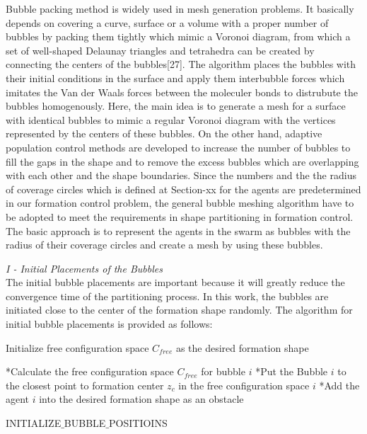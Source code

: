 \documentclass[twoside]{article}
\begin{document}
			Bubble packing method is widely used in mesh generation problems. It basically depends on covering a curve, surface or a volume with a proper number of bubbles by packing them tightly which mimic a Voronoi diagram, from which a set of well-shaped Delaunay triangles and tetrahedra can be created by connecting the centers of the bubbles[27].  The algorithm places the bubbles with their initial conditions in the surface and apply them interbubble forces which imitates the Van der Waals forces between the moleculer bonds  to distrubute the bubbles homogenously. Here, the main idea is to generate a mesh for a surface with identical bubbles to mimic a regular Voronoi diagram with the vertices represented by the centers of these bubbles. On the other hand, adaptive population control  methods are developed to increase the number of bubbles to fill the gaps in the shape and to remove the excess bubbles which are overlapping with each other and the shape boundaries. 
			 Since the numbers and the the radius of coverage circles which is defined at Section-xx for the agents are predetermined in our formation control problem, the general bubble meshing algorithm have to be adopted to meet the requirements in shape partitioning in formation control.  The basic approach is to represent the agents in the swarm as bubbles with the radius of  their coverage circles and create a mesh by using these bubbles. \newline
			
			\textit{			I - Initial Placements of the Bubbles} \\ 

		  The initial bubble placements are important because it will greatly reduce the convergence time of the partitioning process. In this work, the bubbles are initiated close to the center of the formation shape randomly. The algorithm for initial bubble placements is provided as follows:
		  

			
			
			\begin{algorithm}[H]
				
				Initialize free configuration space $C_{free}$ as the desired formation shape
				
				{		
					*Calculate the free configuration space $C_{free}$ for bubble $i$\;
					 *Put the Bubble $i$ to the closest point to  formation center  $z_c$  in the free configuration space $i$ \;
					 *Add the agent $i$ into the desired formation shape as an obstacle \;
				}
				
				
				\caption{INITIALIZE$\_$BUBBLE$\_$POSITIOINS}
			\end{algorithm}
		
\end{document}
